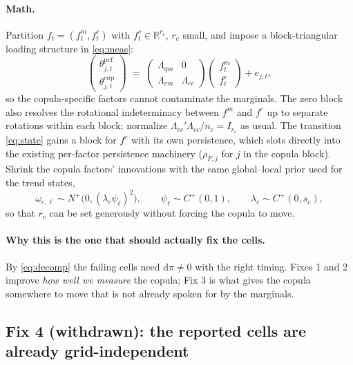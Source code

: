 \documentclass[11pt]{article}
\newcommand{\cop}{\mathrm{cop}}
\newcommand{\pcf}{\mathrm{pcf}}
\begin{document}
\paragraph{Math.} Partition $f_t = (f^m_t, f^c_t)$ with $f^c_t \in
\mathbb{R}^{r_c}$, $r_c$ small, and impose a block-triangular loading structure
in \eqref{eq:meas}:
\begin{equation}
  \begin{pmatrix} \theta^{\pcf}_{j,t} \\[2pt] \theta^{\cop}_{j,t} \end{pmatrix}
  \;=\;
  \begin{pmatrix} \Lambda_{qm} & 0 \\ \Lambda_{cm} & \Lambda_{cc} \end{pmatrix}
  \begin{pmatrix} f^m_t \\ f^c_t \end{pmatrix} + e_{j,t} ,
  \label{eq:blockload}
\end{equation}
so the copula-specific factors cannot contaminate the marginals. The zero block
also resolves the rotational indeterminacy between $f^m$ and $f^c$ up to
separate rotations within each block; normalize $\Lambda_{cc}'\Lambda_{cc}/n_c =
I_{r_c}$ as usual. The transition \eqref{eq:state} gains a block for $f^c$ with
its own persistence, which slots directly into the existing per-factor
persistence machinery ($\rho_{F,j}$ for $j$ in the copula block). Shrink the
copula factors' innovations with the same global--local prior used for the trend
states,
\begin{equation}
  \omega_{c,\ell} \sim N^{+}\bigl(0, (\lambda_c \psi_\ell)^2\bigr), \qquad
  \psi_\ell \sim C^{+}(0,1), \qquad
  \lambda_c \sim C^{+}(0, s_c),
\end{equation}
so that $r_c$ can be set generously without forcing the copula to move.

\paragraph{Why this is the one that should actually fix the cells.} By
\eqref{eq:decomp} the failing cells need $\mathrm{d}\pi \neq 0$ with the right
timing. Fixes 1 and 2 improve \emph{how well we measure} the copula; Fix 3 is
what gives the copula somewhere to move that is not already spoken for by the
marginals.

\subsection{Fix 4 (withdrawn): the reported cells are already grid-independent}
\end{document}
